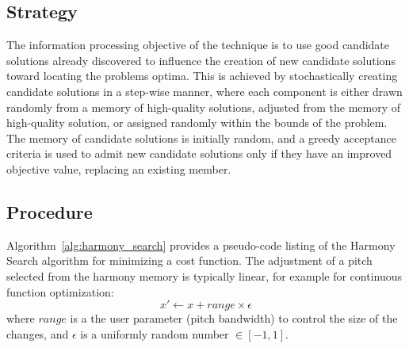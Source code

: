 \subsection{Strategy}
The information processing objective of the technique is to use good candidate solutions already discovered to influence the creation of new candidate solutions toward locating the problems optima.
This is achieved by stochastically creating candidate solutions in a step-wise manner, where each component is either drawn randomly from a memory of high-quality solutions, adjusted from the memory of high-quality solution, or assigned randomly within the bounds of the problem. The memory of candidate solutions is initially random, and a greedy acceptance criteria is used to admit new candidate solutions only if they have an improved objective value, replacing an existing member.

\subsection{Procedure}
Algorithm~\ref{alg:harmony_search} provides a pseudo-code listing of the Harmony Search algorithm for minimizing a cost function. 
The adjustment of a pitch selected from the harmony memory is typically linear, for example for continuous function optimization: 
\begin{equation}
	x\prime \leftarrow x + range \times \epsilon
\end{equation}
where $range$ is a the user parameter (pitch bandwidth) to control the size of the changes, and $\epsilon$ is a uniformly random number $\in [-1,1]$.

